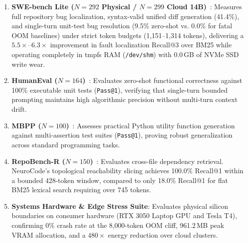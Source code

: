 \documentclass[journal]{IEEEtran}
\begin{document}
\begin{enumerate}
    \item \textbf{SWE-bench Lite ($N=292$ Physical / $N=299$ Cloud 14B)}~\cite{jimenez2024swebench}: Measures full repository bug localization, syntax-valid unified diff generation (41.4\%), and single-turn unit-test bug resolution (9.5\% zero-shot vs. 0.0\% for fatal OOM baselines) under strict token budgets (1,151--1,314 tokens), delivering a $5.5\times$--$6.3\times$ improvement in fault localization Recall@3 over BM25 while operating completely in tmpfs RAM (\texttt{/dev/shm}) with 0.0\,GB of NVMe SSD write wear.
    \item \textbf{HumanEval ($N=164$)}~\cite{chen2021humaneval}: Evaluates zero-shot functional correctness against 100\% executable unit tests (\texttt{Pass@1}), verifying that single-turn bounded prompting maintains high algorithmic precision without multi-turn context drift.
    \item \textbf{MBPP ($N=100$)}~\cite{austin2021mbpp}: Assesses practical Python utility function generation against multi-assertion test suites (\texttt{Pass@1}), proving robust generalization across standard programming tasks.
    \item \textbf{RepoBench-R ($N=150$)}~\cite{liu2023repobench}: Evaluates cross-file dependency retrieval. NeuroCode's topological reachability slicing achieves 100.0\% Recall@1 within a bounded 428-token window, compared to only 18.0\% Recall@1 for flat BM25 lexical search requiring over 745 tokens.
    \item \textbf{Systems Hardware \& Edge Stress Suite}: Evaluates physical silicon boundaries on consumer hardware (RTX 3050 Laptop GPU and Tesla T4), confirming 0\% crash rate at the 8,000-token OOM cliff, 961.2\,MB peak VRAM allocation, and a $480\times$ energy reduction over cloud clusters.
\end{enumerate}
\end{document}
